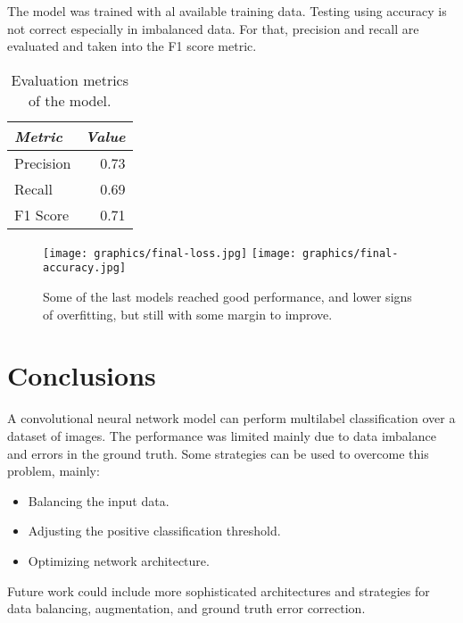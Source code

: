 \documentclass{article}
\begin{document}
The model was trained with al available training data.
Testing using accuracy is not correct especially in imbalanced data.
For that, precision and recall are evaluated and taken into the F1 score metric.

\begin{table}[ht]
  \centering
  \begin{tabular}{l r}
	  {\small \textit{Metric}} & {\small \textit{Value}} \\ \hline
	  Precision                & 0.73                    \\
	  Recall                   & 0.69                    \\
	  F1 Score                 & 0.71                    \\
  \end{tabular}
  \caption{Evaluation metrics of the model.}
\end{table}


\begin{figure}[ht]
  \centering
  \texttt{[image: graphics/final-loss.jpg]}
  \texttt{[image: graphics/final-accuracy.jpg]}
  \caption{Some of the last models reached good performance, and lower signs of overfitting, but still with some margin to improve.}
\end{figure}

\section{Conclusions}
A convolutional neural network model can perform multilabel classification over a dataset of images.
The performance was limited mainly due to data imbalance and errors in the ground truth.
Some strategies can be used to overcome this problem, mainly:

\begin{itemize}
  \item Balancing the input data.
  \item Adjusting the positive classification threshold.
  \item Optimizing network architecture.
\end{itemize}

Future work could include more sophisticated architectures and strategies for data balancing, augmentation, and ground truth error correction.
\end{document}
